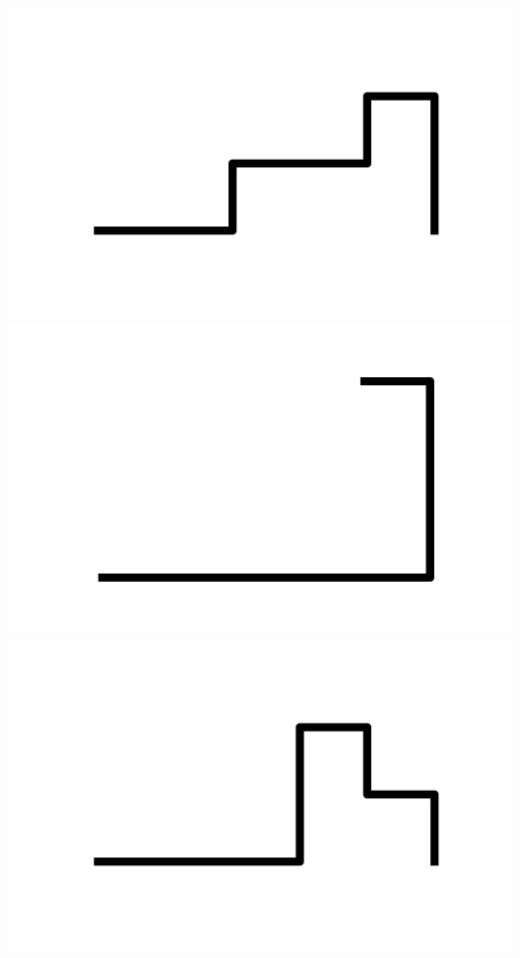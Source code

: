 \documentclass[]{report}
\begin{document}
\includegraphics[scale=.1]{pictures/21/state_cluster_shapes_73.pdf} 
\includegraphics[scale=.1]{pictures/21/state_cluster_shapes_74.pdf} 
\includegraphics[scale=.1]{pictures/21/state_cluster_shapes_75.pdf} 
\end{document}

